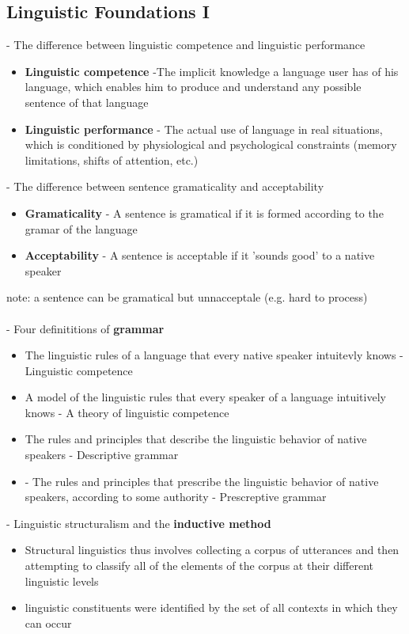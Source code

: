 \documentclass[11pt]{article}
\begin{document}
\subsection{Linguistic Foundations I}
- The difference between linguistic competence and linguistic performance
\begin{itemize}
 \item \textbf{Linguistic competence} -The implicit knowledge a language user has of his language, which enables him to produce and understand any possible sentence of that language
 \item \textbf{Linguistic performance} - The actual use of language in real situations, which is conditioned by physiological and psychological constraints (memory limitations, shifts of attention, etc.)
\end{itemize}
- The difference between sentence gramaticality and acceptability
\begin{itemize}
 \item \textbf{Gramaticality} - A sentence is gramatical if it is formed according to the gramar of the language
\item \textbf{Acceptability} - A sentence is acceptable if it 'sounds good' to a native speaker
\end{itemize}
note: a sentence can be gramatical but unnacceptale (e.g. hard to process)
\\\\
- Four definititions of \textbf{grammar}
\begin{itemize}
 \item The linguistic rules of a language that every native speaker intuitevly knows - Linguistic competence
\item A model of the linguistic rules that every speaker of a language intuitively knows - A theory of linguistic competence 
\item The rules and principles that describe the linguistic behavior of native speakers - Descriptive grammar
\item - The rules and principles that prescribe the linguistic behavior of native speakers, according to some authority - Prescreptive grammar
\end{itemize}
- Linguistic structuralism and the \textbf{inductive method} 
\begin{itemize}
 \item Structural linguistics thus involves collecting a corpus of utterances and then attempting to classify all of the elements of the corpus at their different linguistic levels
\item linguistic constituents were identified by the set of all contexts in which they can occur
\end{itemize}
\end{document}

